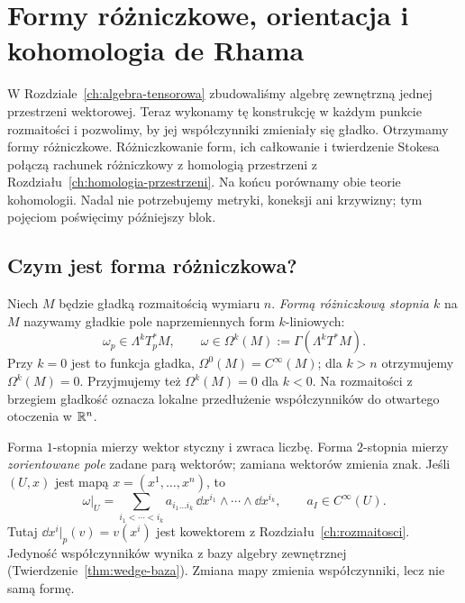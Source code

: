 \chapter{Formy różniczkowe, orientacja i kohomologia de Rhama}
\label{ch:formy-de-rham}

W Rozdziale~\ref{ch:algebra-tensorowa} zbudowaliśmy algebrę
zewnętrzną jednej przestrzeni wektorowej. Teraz wykonamy tę
konstrukcję w każdym punkcie rozmaitości i pozwolimy, by jej
współczynniki zmieniały się gładko. Otrzymamy formy różniczkowe.
Różniczkowanie form, ich całkowanie i twierdzenie Stokesa
połączą rachunek różniczkowy z homologią przestrzeni z
Rozdziału~\ref{ch:homologia-przestrzeni}. Na końcu porównamy
obie teorie kohomologii. Nadal nie potrzebujemy metryki,
koneksji ani krzywizny; tym pojęciom poświęcimy późniejszy blok.

\section{Czym jest forma różniczkowa?}
\label{sec:formy-definicje}

\begin{definicja}
\label{def:forma-rozniczkowa}
Niech $M$ będzie gładką rozmaitością wymiaru $n$.
\emph{Formą różniczkową stopnia $k$} na $M$ nazywamy
gładkie pole naprzemiennych form $k$-liniowych:
\[
 \omega_p\in\Lambda^k T_p^*M,
 \qquad \omega\in\Omega^k(M)
 :=\Gamma(\Lambda^k T^*M).
\]
Przy $k=0$ jest to funkcja gładka,
$\Omega^0(M)=C^\infty(M)$; dla $k>n$ otrzymujemy
$\Omega^k(M)=0$. Przyjmujemy też $\Omega^k(M)=0$ dla $k<0$.
Na rozmaitości z brzegiem gładkość
oznacza lokalne przedłużenie współczynników do
otwartego otoczenia w $\mathbb{R}^n$.
\end{definicja}

Forma $1$-stopnia mierzy wektor styczny i zwraca liczbę.
Forma $2$-stopnia mierzy \emph{zorientowane pole} zadane
parą wektorów; zamiana wektorów zmienia znak.
Jeśli $(U,x)$ jest mapą $x=(x^1,\ldots,x^n)$, to
\begin{equation}\label{eq:forma-lokalna}
 \omega|_U=\sum_{i_1<\cdots<i_k}
 a_{i_1\ldots i_k}\,\dd x^{i_1}\wedge\cdots\wedge\dd x^{i_k},
 \qquad a_I\in C^\infty(U).
\end{equation}
Tutaj $\dd x^i|_p(v)=v(x^i)$ jest kowektorem z
Rozdziału~\ref{ch:rozmaitosci}. Jedyność współczynników
wynika z bazy algebry zewnętrznej
(Twierdzenie~\ref{thm:wedge-baza}). Zmiana mapy zmienia
współczynniki, lecz nie samą formę.


